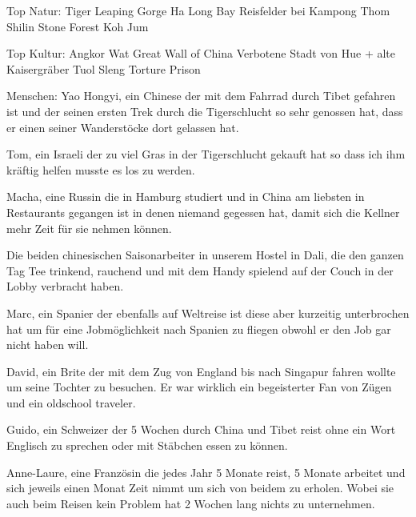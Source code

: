 \documentclass[11pt]{book}
\begin{document}
Top Natur:
Tiger Leaping Gorge
Ha Long Bay
Reisfelder bei Kampong Thom
Shilin Stone Forest
Koh Jum

Top Kultur:
Angkor Wat
Great Wall of China
Verbotene Stadt von Hue + alte Kaisergräber 
Tuol Sleng Torture Prison

Menschen:
Yao Hongyi, ein Chinese der mit dem Fahrrad durch Tibet gefahren ist und der seinen ersten Trek durch die Tigerschlucht so sehr 
genossen hat, dass er einen seiner Wanderstöcke dort gelassen hat.

Tom, ein Israeli der zu viel Gras in der Tigerschlucht gekauft hat so dass ich ihm kräftig helfen musste es los zu werden.

Macha, eine Russin die in Hamburg studiert und in China am liebsten in Restaurants gegangen ist in denen niemand gegessen hat, damit sich 
die Kellner mehr Zeit für sie nehmen können.

Die beiden chinesischen Saisonarbeiter in unserem Hostel in Dali, die den ganzen Tag Tee trinkend, rauchend und mit dem Handy spielend 
auf der Couch in der Lobby verbracht haben.

Marc, ein Spanier der ebenfalls auf Weltreise ist diese aber kurzeitig unterbrochen hat um für eine Jobmöglichkeit nach Spanien zu fliegen 
obwohl er den Job gar nicht haben will.

David, ein Brite der mit dem Zug von England bis nach Singapur fahren wollte um seine Tochter zu besuchen. Er war wirklich ein begeisterter
Fan von Zügen und ein oldschool traveler.

Guido, ein Schweizer der 5 Wochen durch China und Tibet reist ohne ein Wort Englisch zu sprechen oder mit Stäbchen essen zu können.

Anne-Laure, eine Französin die jedes Jahr 5 Monate reist, 5 Monate arbeitet und sich jeweils einen Monat Zeit nimmt um sich von beidem 
zu erholen. Wobei sie auch beim Reisen kein Problem hat 2 Wochen lang nichts zu unternehmen.
\end{document}

